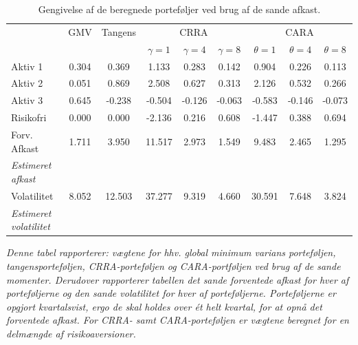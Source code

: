 \documentclass[
  a4paper,
  oneside]{memoir}
\begin{document}
\begin{table}[H]

\caption{\label{tab:sum-true}Gengivelse af de beregnede porteføljer ved brug af de sande afkast.}
\centering
\begin{threeparttable}
\begin{tabular}[t]{lcccccccc}
\toprule
\multicolumn{1}{c}{ } & \multicolumn{1}{c}{GMV} & \multicolumn{1}{c}{Tangens} & \multicolumn{3}{c}{CRRA} & \multicolumn{3}{c}{CARA} \\
\cmidrule(l{3pt}r{3pt}){2-2} \cmidrule(l{3pt}r{3pt}){3-3} \cmidrule(l{3pt}r{3pt}){4-6} \cmidrule(l{3pt}r{3pt}){7-9}
  &   &   & $\gamma=1$ & $\gamma=4$ & $\gamma=8$ & $\theta=1$ & $\theta=4$ & $\theta=8$\\
\midrule
\rowcolor{gray!6}  Aktiv 1 & 0.304 & 0.369 & 1.133 & 0.283 & 0.142 & 0.904 & 0.226 & 0.113\\
Aktiv 2 & 0.051 & 0.869 & 2.508 & 0.627 & 0.313 & 2.126 & 0.532 & 0.266\\
\rowcolor{gray!6}  Aktiv 3 & 0.645 & -0.238 & -0.504 & -0.126 & -0.063 & -0.583 & -0.146 & -0.073\\
Risikofri & 0.000 & 0.000 & -2.136 & 0.216 & 0.608 & -1.447 & 0.388 & 0.694\\
\rowcolor{gray!6}  Forv. Afkast & 1.711 & 3.950 & 11.517 & 2.973 & 1.549 & 9.483 & 2.465 & 1.295\\
\em{Estimeret afkast} & \em{} & \em{} & \em{} & \em{} & \em{} & \em{} & \em{} & \em{}\\
\rowcolor{gray!6}  Volatilitet & 8.052 & 12.503 & 37.277 & 9.319 & 4.660 & 30.591 & 7.648 & 3.824\\
\em{Estimeret volatilitet} & \em{} & \em{} & \em{} & \em{} & \em{} & \em{} & \em{} & \em{}\\
\bottomrule
\end{tabular}
\begin{tablenotes}
\item \textit{Denne tabel rapporterer: vægtene for hhv. global minimum varians porteføljen, tangensporteføljen, CRRA-porteføljen og CARA-portføljen ved brug af de sande momenter. Derudover rapporterer tabellen det sande forventede afkast for hver af porteføljerne og den sande volatilitet for hver af porteføljerne. Porteføljerne er opgjort kvartalsvist, ergo de skal holdes over ét helt kvartal, for at opnå det forventede afkast. For CRRA- samt CARA-porteføljen er vægtene beregnet for en delmængde af risikoaversioner.}
\end{tablenotes}
\end{threeparttable}
\end{table}
\end{document}
